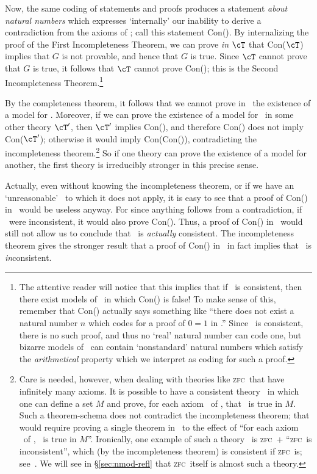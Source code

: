 \documentclass{amsart}
\def\zfc{\textsc{zfc}}
\begin{document}
Now, the same coding of statements and proofs produces a statement
\emph{about natural numbers} which expresses `internally' our
inability to derive a contradiction from the axioms of \cT; call
this statement Con(\cT).  By internalizing the proof of the First
Incompleteness Theorem, we can prove \emph{in $\cT$} that
Con($\cT$) implies that $G$ is not provable, and hence that $G$ is
true.  Since $\cT$ cannot prove that $G$ is true, it follows that
$\cT$ cannot prove Con(\cT); this is the Second Incompleteness
Theorem.\footnote{The attentive reader will notice that this implies
  that if \cT\ is consistent, then there exist models of \cT\ in
  which Con(\cT) is false!  To make sense of this, remember that
  Con(\cT) actually says something like ``there does not exist a
  natural number $n$ which codes for a proof of $0=1$ in \cT.''
  Since \cT\ is consistent, there is no such proof, and thus no
  `real' natural number can code one, but bizarre models of \cT\ can
  contain `nonstandard' natural numbers which satisfy the
  \emph{arithmetical} property which we interpret as coding for such a
  proof.}

By the completeness theorem, it follows that we cannot prove in \cT\
the existence of a model for \cT.  Moreover, if we can prove the
existence of a model for \cT\ in some other theory $\cT'$, then $\cT'$
implies Con(\cT), and therefore Con(\cT) does not imply Con($\cT'$);
otherwise it would imply Con(Con(\cT)), contradicting the
incompleteness theorem.\footnote{Care is needed, however, when dealing
  with theories like \zfc\ that have infinitely many axioms.  It is
  possible to have a consistent theory \cT\ in which one can define a
  set $M$ and prove, for each axiom \psi\ of \cT, that \psi\ is true
  in $M$.  Such a theorem-schema does not contradict the
  incompleteness theorem; that would require proving a single theorem
  in \cT\ to the effect of ``for each axiom \psi\ of \cT, \psi\ is
  true in $M$''.  Ironically, one example of such a theory \cT\ is
  \zfc\ + ``\zfc\ is inconsistent'', which (by the incompleteness
  theorem) is consistent if \zfc\ is;
  see~\cite[IV.10]{kunen:set-theory}.  We will see in
  \S\ref{sec:nmod-refl} that \zfc\ itself is almost such a
  theory.\label{fn:inf-ax}} So if one theory can prove the existence
of a model for another, the first theory is irreducibly stronger in
this precise sense.

\begin{rmk}
  Actually, even without knowing the incompleteness theorem, or if we
  have an `unreasonable' \cT\ to which it does not apply, it is easy
  to see that a proof of Con(\cT) in \cT\ would be useless anyway.
  For since anything follows from a contradiction, if \cT\ were
  inconsistent, it would also prove Con(\cT).  Thus, a proof of
  Con(\cT) in \cT\ would still not allow us to conclude that \cT\ is
  \emph{actually} consistent.  The incompleteness theorem gives the
  stronger result that a proof of Con(\cT) in \cT\ in fact implies
  that \cT\ is \emph{in}consistent.
\end{rmk}
\end{document}
